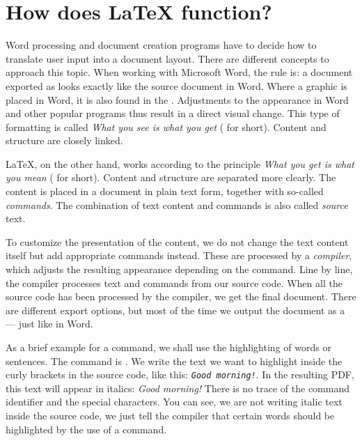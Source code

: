 \chapter{How does \LaTeX{} function?}
\label{sec:basic-functionality}


Word processing and document creation programs have to decide how to translate user input into a document layout.
There are different concepts to approach this topic.
When working with Microsoft Word, the rule is: a document exported as  looks exactly like the source document in Word. 
Where a graphic is placed in Word, it is also found in the . 
Adjustments to the appearance in Word and other popular programs thus result in a direct visual change. 
This type of formatting is called \emph{What you see is what you get} ( for short). 
Content and structure are closely linked.

\LaTeX{}, on the other hand, works according to the principle \emph{What you get is what you mean} ( for short). 
Content and structure are separated more clearly.
The content is placed in a document in plain text form, together with so-called \emph{commands}. 
The combination of text content and commands is also called \emph{source} text.

To customize the presentation of the content, we do not change the text content itself but add appropriate commands instead. 
These are processed by a \emph{compiler}, which adjusts the resulting appearance depending on the command. 
Line by line, the compiler processes text and commands from our source code. 
When all the source code has been processed by the compiler, we get the final document. 
There are different export options, but most of the time we output the document as a  --- just like in Word.

As a brief example for a command, we shall use the highlighting of words or sentences. 
The command is \texttt{\emph{}}. 
We write the text we want to highlight inside the curly brackets in the source code, like this: 
\texttt{\emph{Good morning!}}. 
In the resulting PDF, this text will appear in italics: \emph{Good morning!} 
There is no trace of the command identifier and the special characters. 
You can see, we are not writing italic text inside the source code, we just tell the compiler that certain words should be highlighted by the use of a command.

